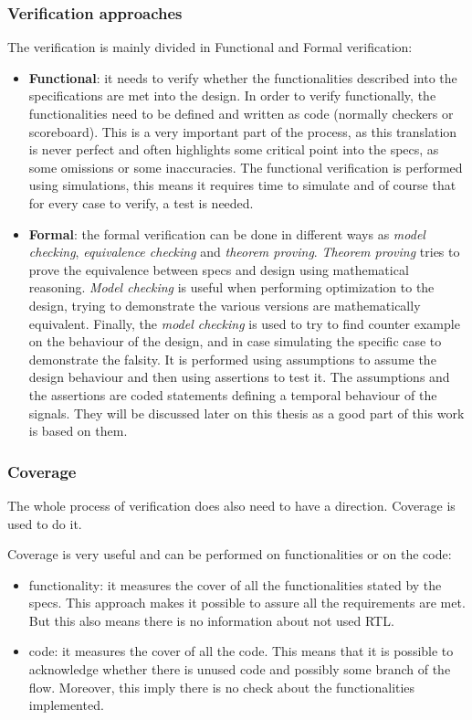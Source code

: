 \subsubsection{Verification approaches}
The verification is mainly divided in Functional and Formal verification:
\begin{itemize}
    \item \textbf{Functional}: it needs to verify whether the functionalities described into the specifications are met into the design. In order to verify functionally, the functionalities need to be defined and written as code (normally checkers or scoreboard). This is a very important part of the process, as this translation is never perfect and often highlights some critical point into the specs, as some omissions or some inaccuracies. The functional verification is performed using simulations, this means it requires time to simulate and of course that for every case to verify, a test is needed.
    
    \item \textbf{Formal}: the formal verification can be done in different ways as \textit{model checking}, \textit{equivalence checking} and \textit{theorem proving}. \textit{Theorem proving} tries to prove the equivalence between specs and design using mathematical reasoning. \textit{Model checking} is useful when performing optimization to the design, trying to demonstrate the various versions are mathematically equivalent. Finally, the \textit{model checking} is used to try to find counter example on the behaviour of the design, and in case simulating the specific case to demonstrate the falsity. It is performed using assumptions to assume the design behaviour and then using assertions to test it. The assumptions and the assertions are coded statements defining a temporal behaviour of the signals. They will be discussed later on this thesis as a good part of this work is based on them.
\end{itemize}

\bigskip

\subsubsection{Coverage}
The whole process of verification does also need to have a direction. Coverage is used to do it.

Coverage is very useful and can be performed on functionalities or on the code:
\begin{itemize}
    \item functionality: it measures the cover of all the functionalities stated by the specs. This approach makes it possible to assure all the requirements are met. But this also means there is no information about not used RTL.
    
    \item code: it measures the cover of all the code. This means that it is possible to acknowledge whether there is unused code and possibly some branch of the flow. Moreover, this imply there is no check about the functionalities implemented.

\end{itemize}

